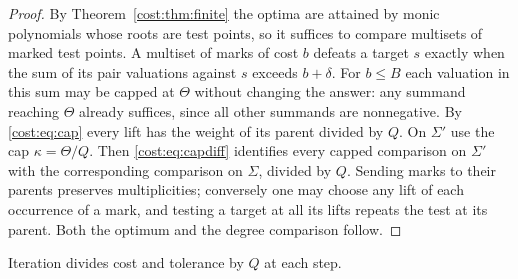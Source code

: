 \begin{proof}
By Theorem~\ref{cost:thm:finite} the optima are attained by monic polynomials whose roots are
test points, so it suffices to compare multisets of marked test points. A multiset of marks
of cost $b$ defeats a target $s$ exactly when the sum of its pair valuations against $s$
exceeds $b+\delta$. For $b\le B$ each valuation in this sum may be capped at $\Theta$
without changing the answer: any summand reaching $\Theta$ already suffices, since all other
summands are nonnegative. By \eqref{cost:eq:cap} every lift has the weight of its parent
divided by $Q$. On $\Sigma'$ use the cap $\kappa=\Theta/Q$. Then \eqref{cost:eq:capdiff}
identifies every capped comparison on $\Sigma'$ with the corresponding comparison on
$\Sigma$, divided by $Q$. Sending marks to their parents preserves multiplicities;
conversely one may choose any lift of each occurrence of a mark, and testing a target at
all its lifts repeats the test at its parent. Both the optimum and the degree comparison
follow.
\end{proof}

Iteration divides cost and tolerance by $Q$ at each step.

